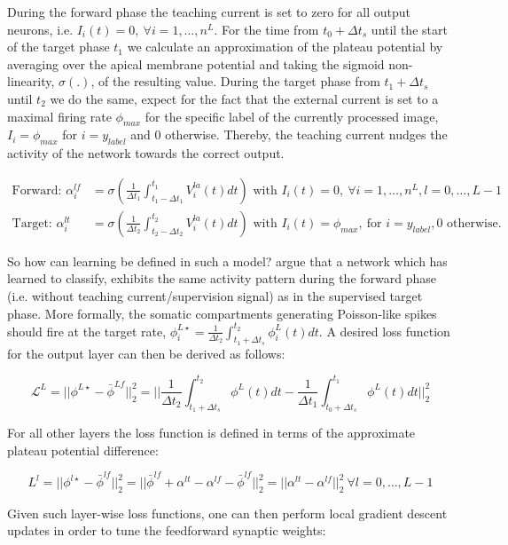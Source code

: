 \documentclass[colorinlistoftodos]{article}
\theoremstyle{definition}
\begin{document}
During the forward phase the teaching current is set to zero for all output neurons, i.e. $I_i(t) = 0, \ \forall i=1,\dots, n^L$. For the time from $t_0 + \Delta t_s$ until the start of the target phase $t_1$ we calculate an approximation of the plateau potential by averaging over the apical membrane potential and taking the sigmoid non-linearity, $\sigma(.)$, of the resulting value.
During the target phase from $t_1 + \Delta t_s$ until $t_2$ we do the same, expect for the fact that the external current is set to a maximal firing rate $\phi_{max}$ for the specific label of the currently processed image, $I_i = \phi_{max}$ for $i = y_{label}$ and 0 otherwise. Thereby, the teaching current nudges the activity of the network towards the correct output.
	
\begin{align*}
	\text{Forward:  } \alpha_i^{lf} &= \sigma\left(\frac{1}{\Delta t_1} \int_{t_1 - \Delta t_1}^{t_1} V_i^{la}(t)dt\right) \text{  with  } I_i(t) = 0, \ \forall i=1,\dots, n^L, l=0,\dots, L-1 \\
	\text{Target:  } \alpha_i^{lt} &= \sigma\left(\frac{1}{\Delta t_2} \int_{t_2 - \Delta t_2}^{t_2} V_i^{la}(t)dt\right) \text{  with  } I_i(t) = \phi_{max}, \ \text{for  } i = y_{label}, 0 \text{  otherwise.}
\end{align*}

So how can learning be defined in such a model? \citet{guerguiev2017} argue that a network which has learned to classify, exhibits the same activity pattern during the forward phase (i.e. without teaching current/supervision signal) as in the supervised target phase. More formally, the somatic compartments generating Poisson-like spikes should fire at the target rate, $\phi_i^{L\star} = \frac{1}{\Delta t_2} \int_{t_1 + \Delta t_s}^{t_2} \phi_i^L(t)dt$. A desired loss function for the output layer can then be derived as follows:

$$\mathcal{L}^L = ||\phi^{L\star} - \bar{\phi}^{Lf}||_2^2 = ||\frac{1}{\Delta t_2} \int_{t_1 + \Delta t_s}^{t_2} \phi^L(t)dt - \frac{1}{\Delta t_1} \int_{t_0 + \Delta t_s}^{t_1} \phi^L(t)dt||_2^2$$

For all other layers the loss function is defined in terms of the approximate plateau potential difference:

$$L^l = ||\phi^{l\star} - \bar{\phi}^{lf}||_2^2 = ||\bar{\phi}^{lf} + \alpha^{lt} - \alpha^{lf} - \bar{\phi}^{lf}||_2^2 = ||\alpha^{lt} - \alpha^{lf}||_2^2 \ \forall l=0, \dots, L-1$$

Given such layer-wise loss functions, one can then perform local gradient descent updates in order to tune the feedforward synaptic weights:
\end{document}
